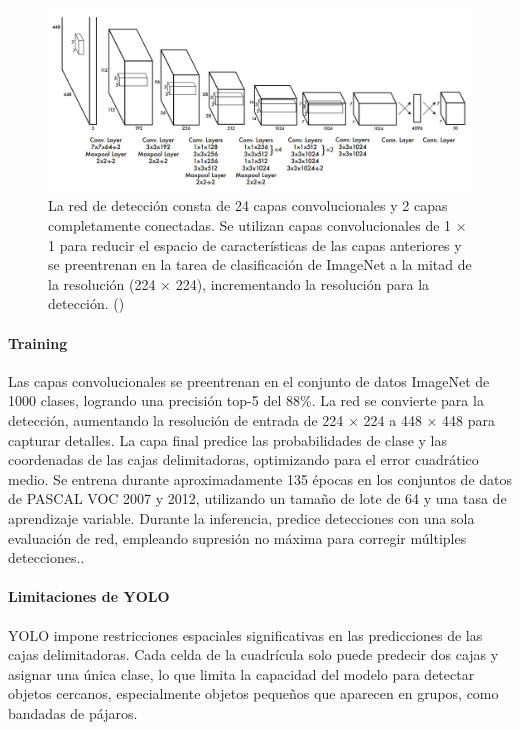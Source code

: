 \begin{figure}[H]
	\begin{center}
		\includegraphics[width=1\textwidth]{2/figures/yolo3.jpeg}
		\caption{La red de detección consta de 24 capas convolucionales y 2 capas completamente conectadas. Se utilizan capas convolucionales de 1 × 1 para reducir el espacio de características de las capas anteriores y se preentrenan en la tarea de clasificación de ImageNet a la mitad de la resolución (224 × 224), incrementando la resolución para la detección. (\cite{tecnica4})}
	\end{center}
\end{figure}

\paragraph{Training} 
Las capas convolucionales se preentrenan en el conjunto de datos ImageNet de 1000 clases, logrando una precisión top-5 del 88\%. La red se convierte para la detección, aumentando la resolución de entrada de 224 × 224 a 448 × 448 para capturar detalles. La capa final predice las probabilidades de clase y las coordenadas de las cajas delimitadoras, optimizando para el error cuadrático medio. Se entrena durante aproximadamente 135 épocas en los conjuntos de datos de PASCAL VOC 2007 y 2012, utilizando un tamaño de lote de 64 y una tasa de aprendizaje variable. Durante la inferencia, predice detecciones con una sola evaluación de red, empleando supresión no máxima para corregir múltiples detecciones..

\paragraph{Limitaciones de YOLO}
YOLO impone restricciones espaciales significativas en las predicciones de las cajas delimitadoras. Cada celda de la cuadrícula solo puede predecir dos cajas y asignar una única clase, lo que limita la capacidad del modelo para detectar objetos cercanos, especialmente objetos pequeños que aparecen en grupos, como bandadas de pájaros.

